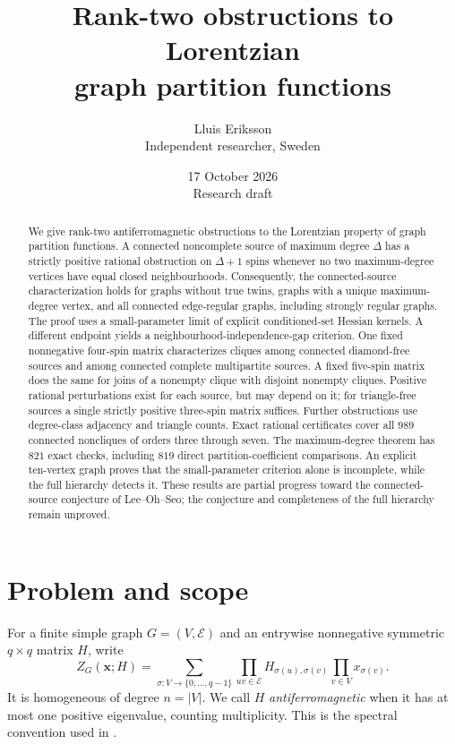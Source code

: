 \documentclass[11pt]{article}
\title{Rank-two obstructions to Lorentzian\\graph partition functions}
\author{Lluis Eriksson\\ \small Independent researcher, Sweden}
\date{17 October 2026\\ \small Research draft}
\theoremstyle{remark}
\begin{document}
\maketitle
\begin{abstract}
We give rank-two antiferromagnetic obstructions to the Lorentzian
property of graph partition functions. A connected noncomplete source
of maximum degree $\Delta$ has a strictly positive rational obstruction
on $\Delta+1$ spins whenever no two maximum-degree vertices have equal
closed neighbourhoods. Consequently, the connected-source
characterization holds for graphs without true twins, graphs with a
unique maximum-degree vertex, and all connected edge-regular graphs,
including strongly regular graphs. The proof uses a small-parameter
limit of explicit conditioned-set Hessian kernels.
A different endpoint yields a neighbourhood-independence-gap criterion.
One fixed nonnegative four-spin matrix characterizes cliques among
connected diamond-free sources and among connected complete multipartite
sources. A fixed five-spin matrix does the same for joins of a nonempty
clique with disjoint nonempty cliques. Positive rational perturbations
exist for each source, but may depend on it; for triangle-free sources
a single strictly positive three-spin matrix suffices.
Further obstructions use degree-class adjacency and triangle counts.
Exact rational certificates cover all $989$ connected noncliques of
orders three through seven. The maximum-degree theorem has $821$
exact checks, including $819$ direct partition-coefficient comparisons.
An explicit ten-vertex graph proves that the small-parameter criterion
alone is incomplete, while the full hierarchy detects it.
These results are partial progress toward the connected-source
conjecture of Lee--Oh--Seo; the conjecture and completeness of the
full hierarchy remain unproved.
\end{abstract}

\section{Problem and scope}
For a finite simple graph $G=(V,\mathcal{E})$ and an entrywise nonnegative
symmetric $q\times q$ matrix $H$, write
\begin{equation}
 Z_G(\mathbf x;H)
 =\sum_{\sigma:V\to\{0,\ldots,q-1\}}
       \prod_{uv\in\mathcal{E}}H_{\sigma(u),\sigma(v)}
       \prod_{v\in V}x_{\sigma(v)}.                 \label{eq:Z}
\end{equation}
It is homogeneous of degree $n=|V|$. We call $H$
\emph{antiferromagnetic} when it has at most one positive eigenvalue,
counting multiplicity. This is the spectral convention used in
\cite{LOS,LS}.
\end{document}
